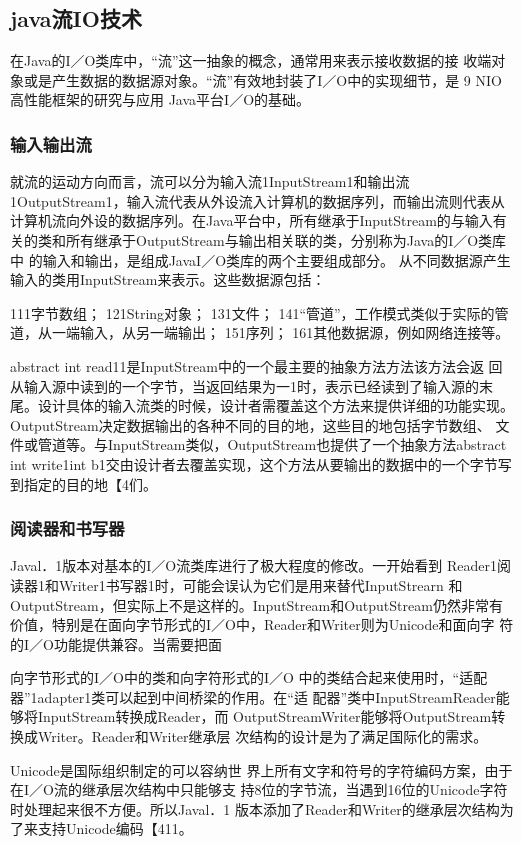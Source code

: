 \subsection*{java流IO技术}
在Java的I／O类库中，“流”这一抽象的概念，通常用来表示接收数据的接
收端对象或是产生数据的数据源对象。“流”有效地封装了I／O中的实现细节，是
9
NIO高性能框架的研究与应用
Java平台I／O的基础。
\subsubsection*{输入输出流}
就流的运动方向而言，流可以分为输入流1InputStream1和输出流
1OutputStream1，输入流代表从外设流入计算机的数据序列，而输出流则代表从
计算机流向外设的数据序列。在Java平台中，所有继承于InputStream的与输入有
关的类和所有继承于OutputStream与输出相关联的类，分别称为Java的I／O类库中
的输入和输出，是组成JavaI／O类库的两个主要组成部分。
从不同数据源产生输入的类用InputStream来表示。这些数据源包括：


111字节数组；
121String对象；
131文件；
141“管道”，工作模式类似于实际的管道，从一端输入，从另一端输出；
151序列；
161其他数据源，例如网络连接等。


abstract int read11是InputStream中的一个最主要的抽象方法方法该方法会返
回从输入源中读到的一个字节，当返回结果为一1时，表示已经读到了输入源的末
尾。设计具体的输入流类的时候，设计者需覆盖这个方法来提供详细的功能实现。
OutputStream决定数据输出的各种不同的目的地，这些目的地包括字节数组、
文件或管道等。与InputStream类似，OutputStream也提供了一个抽象方法abstract
int write1int b1交由设计者去覆盖实现，这个方法从要输出的数据中的一个字节写
到指定的目的地【4们。
\subsubsection*{阅读器和书写器}
Javal．1版本对基本的I／O流类库进行了极大程度的修改。一开始看到
Reader1阅读器1和Writer1书写器1时，可能会误认为它们是用来替代InputStrearn
和OutputStream，但实际上不是这样的。InputStream和OutputStream仍然非常有
价值，特别是在面向字节形式的I／O中，Reader和Writer则为Unicode和面向字
符的I／O功能提供兼容。当需要把面

向字节形式的I／O中的类和向字符形式的I／O
中的类结合起来使用时，“适配器”1adapter1类可以起到中间桥梁的作用。在“适
配器”类中InputStreamReader能够将InputStream转换成Reader，而
OutputStreamWriter能够将OutputStream转换成Writer。Reader和Writer继承层
次结构的设计是为了满足国际化的需求。

Unicode是国际组织制定的可以容纳世
界上所有文字和符号的字符编码方案，由于在I／O流的继承层次结构中只能够支
持8位的字节流，当遇到16位的Unicode字符时处理起来很不方便。所以Javal．1
版本添加了Reader和Writer的继承层次结构为了来支持Unicode编码【411。
